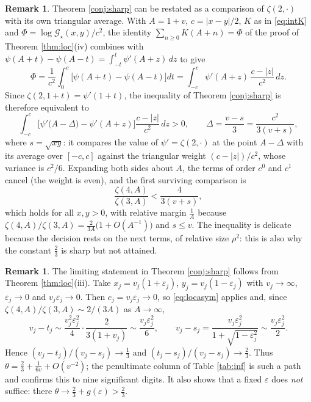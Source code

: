 \documentclass[11pt,a4paper]{amsart}
\theoremstyle{definition}
\newtheorem{remark}[theorem]{Remark}
\newcommand{\Gs}{\mathcal{G}_{\star}}
\newcommand{\eps}{\varepsilon}
\begin{document}
\begin{remark}\label{rem:equiv}
Theorem \ref{conj:sharp} can be restated as a comparison of $\zeta(2,\cdot)$ with its
own triangular average. With $A=1+v$, $c=|x-y|/2$, $K$ as in \eqref{eq:intK} and
$\Phi=\log\Gs(x,y)/c^{2}$, the identity
$\sum_{n\ge0}K(A+n)=\Phi$ of the proof of Theorem \ref{thm:loc}(iv) combines with
$\psi(A+t)-\psi(A-t)=\int_{-t}^{t}\psi'(A+z)\,dz$ to give
\[
  \Phi=\frac{1}{c^{2}}\int_{0}^{c}\big[\psi(A+t)-\psi(A-t)\big]dt
     =\int_{-c}^{c}\psi'(A+z)\,\frac{c-|z|}{c^{2}}\,dz .
\]
Since $\zeta(2,1+t)=\psi'(1+t)$, the inequality of Theorem \ref{conj:sharp} is therefore
equivalent to
\[
  \int_{-c}^{c}\Big[\psi'\!\big(A-\Delta\big)-\psi'(A+z)\Big]\frac{c-|z|}{c^{2}}\,dz>0,
  \qquad \Delta=\frac{v-s}{3}=\frac{c^{2}}{3(v+s)},
\]
where $s=\sqrt{xy}$: it compares the value of $\psi'=\zeta(2,\cdot)$ at the point
$A-\Delta$ with its average over $[-c,c]$ against the triangular weight $(c-|z|)/c^{2}$,
whose variance is $c^{2}/6$. Expanding both sides about $A$, the terms of order $c^{0}$ and
$c^{1}$ cancel (the weight is even), and the first surviving comparison is
\[
  \frac{\zeta(4,A)}{\zeta(3,A)}<\frac{4}{3(v+s)} ,
\]
which holds for all $x,y>0$, with relative margin $\frac{1}{A}$ because
$\zeta(4,A)/\zeta(3,A)=\frac{2}{3A}\big(1+O(A^{-1})\big)$ and $s\le v$. The inequality is
delicate because the decision rests on the next terms, of relative size $\rho^{2}$: this is
also why the constant $\frac23$ is sharp but not attained.
\end{remark}

\begin{remark}
The limiting statement in Theorem \ref{conj:sharp} follows from Theorem
\ref{thm:loc}(iii). Take $x_{j}=v_{j}(1+\eps_{j})$, $y_{j}=v_{j}(1-\eps_{j})$ with
$v_{j}\to\infty$, $\eps_{j}\to0$ and $v_{j}\eps_{j}\to0$. Then $c_{j}=v_{j}\eps_{j}\to0$,
so \eqref{eq:locasym} applies and, since $\zeta(4,A)/\zeta(3,A)\sim2/(3A)$ as
$A\to\infty$,
\[
  v_{j}-t_{j}\sim\frac{v_{j}^{2}\eps_{j}^{2}}{4}\cdot\frac{2}{3(1+v_{j})}
  \sim\frac{v_{j}\eps_{j}^{2}}{6},
  \qquad
  v_{j}-s_{j}=\frac{v_{j}\eps_{j}^{2}}{1+\sqrt{1-\eps_{j}^{2}}}\sim\frac{v_{j}\eps_{j}^{2}}{2}.
\]
Hence $(v_{j}-t_{j})/(v_{j}-s_{j})\to\frac13$ and $(t_{j}-s_{j})/(v_{j}-s_{j})\to\frac23$. Thus
$\theta=\frac23+\frac{1}{6v}+O(v^{-2})$; the penultimate column of Table \ref{tab:inf} is
such a path and confirms this to nine significant digits. It also shows that a fixed
$\eps$ does \emph{not} suffice: there $\theta\to\frac23+g(\eps)>\frac23$.
\end{remark}
\end{document}
